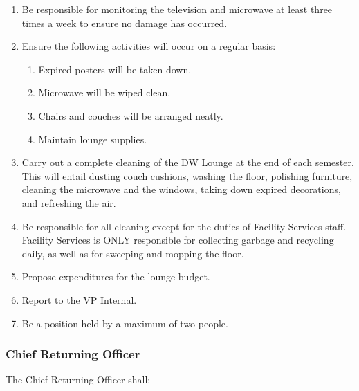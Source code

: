 \begin{enumerate}
 \item
  Be responsible for monitoring the television and microwave at least
  three times a week to ensure no damage has occurred.
 \item
  Ensure the following activities will occur on a regular basis:

  \begin{enumerate}
   \item
    Expired posters will be taken down.
   \item
    Microwave will be wiped clean.
   \item
    Chairs and couches will be arranged neatly.
   \item
    Maintain lounge supplies.
  \end{enumerate}
 \item
  Carry out a complete cleaning of the DW Lounge at the end of each
  semester. This will entail dusting couch cushions, washing the floor,
  polishing furniture, cleaning the microwave and the windows, taking
  down expired decorations, and refreshing the air.
 \item
  Be responsible for all cleaning except for the duties of Facility
  Services staff. Facility Services is ONLY responsible for collecting
  garbage and recycling daily, as well as for sweeping and mopping the
  floor.
 \item
  Propose expenditures for the lounge budget.
 \item
  Report to the VP Internal.
 \item
  Be a position held by a maximum of two people.

\end{enumerate}

\hypertarget{chief-returning-officer}{%
 \subsubsection{Chief Returning
  Officer}
 \label{chief-returning-officer}}
The Chief Returning Officer shall:

